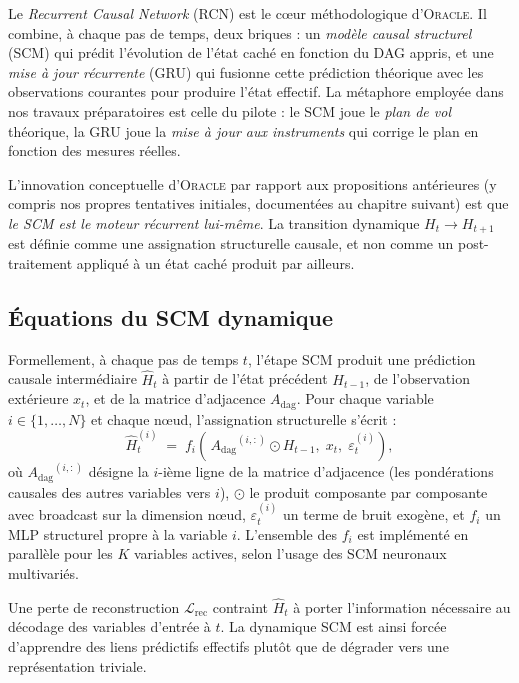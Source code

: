 \documentclass[14pt,a4paper,openany]{extreport}
\theoremstyle{definition}
\newcommand{\Oracle}{\textsc{Oracle}}
\newcommand{\Adag}{\ensuremath{A_{\mathrm{dag}}}}
\newcommand{\Ht}{\ensuremath{H_t}}
\newcommand{\Lrec}{\ensuremath{\mathcal{L}_{\mathrm{rec}}}}
\begin{document}
Le \emph{Recurrent Causal Network} (RCN) est le cœur méthodologique d'\Oracle{}. Il combine, à chaque pas de temps, deux briques : un \emph{modèle causal structurel} (SCM) qui prédit l'évolution de l'état caché en fonction du DAG appris, et une \emph{mise à jour récurrente} (GRU) qui fusionne cette prédiction théorique avec les observations courantes pour produire l'état effectif. La métaphore employée dans nos travaux préparatoires est celle du pilote : le SCM joue le \emph{plan de vol} théorique, la GRU joue la \emph{mise à jour aux instruments} qui corrige le plan en fonction des mesures réelles.

L'innovation conceptuelle d'\Oracle{} par rapport aux propositions antérieures (y compris nos propres tentatives initiales, documentées au chapitre suivant) est que \emph{le SCM est le moteur récurrent lui-même}. La transition dynamique $\Ht \to H_{t+1}$ est définie comme une assignation structurelle causale, et non comme un post-traitement appliqué à un état caché produit par ailleurs.

\subsection{Équations du SCM dynamique}
\label{ssec:oracle-rcn-scm}

Formellement, à chaque pas de temps $t$, l'étape SCM produit une prédiction causale intermédiaire $\hat{H}_t$ à partir de l'état précédent $H_{t-1}$, de l'observation extérieure $x_t$, et de la matrice d'adjacence $\Adag$. Pour chaque variable $i \in \{1, \ldots, N\}$ et chaque nœud, l'assignation structurelle s'écrit :
\begin{equation}
  \hat{H}_t^{(i)} \;=\; f_i\!\left(\, \Adag^{(i,:)} \odot H_{t-1},\; x_t,\; \varepsilon_t^{(i)} \right),
  \label{eq:scm-update}
\end{equation}
où $\Adag^{(i,:)}$ désigne la $i$-ième ligne de la matrice d'adjacence (les pondérations causales des autres variables vers $i$), $\odot$ le produit composante par composante avec broadcast sur la dimension nœud, $\varepsilon_t^{(i)}$ un terme de bruit exogène, et $f_i$ un MLP structurel propre à la variable $i$. L'ensemble des $f_i$ est implémenté en parallèle pour les $K$ variables actives, selon l'usage des SCM neuronaux multivariés.

Une perte de reconstruction $\Lrec$ contraint $\hat{H}_t$ à porter l'information nécessaire au décodage des variables d'entrée à $t$. La dynamique SCM est ainsi forcée d'apprendre des liens prédictifs effectifs plutôt que de dégrader vers une représentation triviale.
\end{document}
